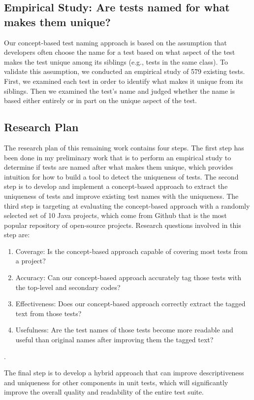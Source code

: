 \documentclass[proposal.tex]{subfiles}
\begin{document}
\subsection{Empirical Study: Are tests named for what makes them unique?}
\label{sec:unique-test-name}

Our concept-based test naming approach is based on the assumption that developers often choose the name for a test based on what aspect of the test makes the test unique among its siblings (e.g., tests in the same class).
%
To validate this assumption, we conducted an empirical study of \num{579} existing tests.
%
First, we examined each test in order to identify what makes it unique from its siblings.
%
Then we examined the test's name and judged whether the name is based either entirely or in part on the unique aspect of the test.

\subsection{Research Plan}

The research plan of this remaining work contains four steps.
%
The first step has been done in my preliminary work that is to perform an empirical study to determine if tests are named after what makes them unique, which provides intuition for how to build a tool to detect the uniqueness of tests.
%
The second step is to develop and implement a concept-based approach to extract the uniqueness of tests and improve existing test names with the uniqueness.
%
The third step is targeting at evaluating the concept-based approach with a randomly selected set of \num{10} Java projects, which come from Github that is the most popular repository of open-source projects.
%
Research questions involved in this step are:
\begin{enumerate}
    \item Coverage: Is the concept-based approach capable of covering most tests from a project?
    \item Accuracy: Can our concept-based approach accurately tag those tests with the top-level and secondary codes?
    \item Effectiveness: Does our concept-based approach correctly extract the tagged text from those tests?
    \item Usefulness: Are the test names of those tests become more readable and useful than original names after improving them the tagged text?
\end{enumerate}.

The final step is to develop a hybrid approach that can improve descriptiveness and uniqueness for other components in unit tests, which will significantly improve the overall quality and readability of the entire test suite.
\end{document}
